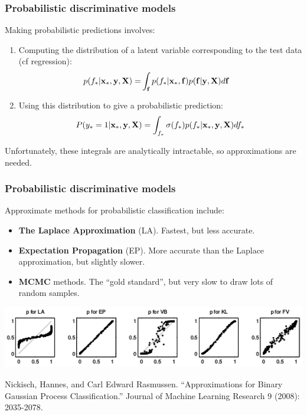 \begin{frame}
\frametitle{Probabilistic discriminative models}
Making probabilistic predictions involves:
\begin{enumerate}
\item Computing the distribution of a latent variable corresponding to the test data (cf regression):
\begin{align*}
p(f_* | {\bf x}_*, {\bf y}, {\bf X}) = & \int_{\bf f} p(f_* | {\bf x}_*, {\bf f}) p({\bf f}|{\bf y},{\bf X}) d{\bf f}
\end{align*}
\item Using this distribution to give a probabilistic prediction:
\begin{align*}
P(y_*=1|{\bf x}_*,{\bf y},{\bf X}) = \int_{f_*} \sigma(f_*) p(f_*|{\bf x}_*,{\bf y},{\bf X}) df_*
\end{align*}
\end{enumerate}
Unfortunately, these integrals are analytically intractable, so approximations are needed.\par
\end{frame}

\begin{frame}
\frametitle{Probabilistic discriminative models}
Approximate methods for probabilistic classification include:
\begin{itemize}
\item {\bf The Laplace Approximation} (LA).  Fastest, but less accurate.
\item {\bf Expectation Propagation} (EP).  More accurate than the Laplace approximation, but slightly slower.
\item {\bf MCMC} methods. The ``gold standard'', but very slow to draw lots of random samples.
\end{itemize}
\vspace{0.25cm}
\includegraphics[width=\textwidth]{nickisch_figure}
\begin{tiny}
Nickisch, Hannes, and Carl Edward Rasmussen. ``Approximations for Binary Gaussian Process Classification.'' Journal of Machine Learning Research 9 (2008): 2035-2078.\par
\end{tiny}
\end{frame}



